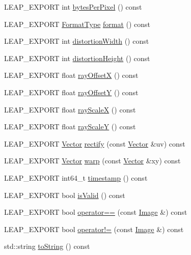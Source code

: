 \begin{DoxyCompactItemize}
\item 
L\+E\+A\+P\+\_\+\+E\+X\+P\+O\+RT int \hyperlink{class_leap_1_1_image_aa4a51ac912a8f4676b8b60c3119f0dba}{bytes\+Per\+Pixel} () const
\item 
L\+E\+A\+P\+\_\+\+E\+X\+P\+O\+RT \hyperlink{class_leap_1_1_image_acefbe5d3803afc9f433a6e3856d242d1}{Format\+Type} \hyperlink{class_leap_1_1_image_a50d3952ed622312536c9f935987156c1}{format} () const
\item 
L\+E\+A\+P\+\_\+\+E\+X\+P\+O\+RT int \hyperlink{class_leap_1_1_image_a8199bd54d44ad2f47f87c1672fae6fbc}{distortion\+Width} () const
\item 
L\+E\+A\+P\+\_\+\+E\+X\+P\+O\+RT int \hyperlink{class_leap_1_1_image_a151e6f3bf58e7b7e2f54d8620c440c1c}{distortion\+Height} () const
\item 
L\+E\+A\+P\+\_\+\+E\+X\+P\+O\+RT float \hyperlink{class_leap_1_1_image_ae07452257740b6050bf74cb835dc7f9a}{ray\+OffsetX} () const
\item 
L\+E\+A\+P\+\_\+\+E\+X\+P\+O\+RT float \hyperlink{class_leap_1_1_image_a7ae5ea2e7bcb151d50ad5ca03b1c3a37}{ray\+OffsetY} () const
\item 
L\+E\+A\+P\+\_\+\+E\+X\+P\+O\+RT float \hyperlink{class_leap_1_1_image_a250f1d16a456cc7887bb8a2ca3958bb0}{ray\+ScaleX} () const
\item 
L\+E\+A\+P\+\_\+\+E\+X\+P\+O\+RT float \hyperlink{class_leap_1_1_image_a2a234dbcb6818b0d7cf1527682c1fdf6}{ray\+ScaleY} () const
\item 
L\+E\+A\+P\+\_\+\+E\+X\+P\+O\+RT \hyperlink{struct_leap_1_1_vector}{Vector} \hyperlink{class_leap_1_1_image_a76443f4064feb15dad132be15f9fa444}{rectify} (const \hyperlink{struct_leap_1_1_vector}{Vector} \&uv) const
\item 
L\+E\+A\+P\+\_\+\+E\+X\+P\+O\+RT \hyperlink{struct_leap_1_1_vector}{Vector} \hyperlink{class_leap_1_1_image_a8bb3e9747ecaba23b2a47043d823ee24}{warp} (const \hyperlink{struct_leap_1_1_vector}{Vector} \&xy) const
\item 
L\+E\+A\+P\+\_\+\+E\+X\+P\+O\+RT int64\+\_\+t \hyperlink{class_leap_1_1_image_ae6cce7f3c7ebc323543a73f1b9c77dc3}{timestamp} () const
\item 
L\+E\+A\+P\+\_\+\+E\+X\+P\+O\+RT bool \hyperlink{class_leap_1_1_image_a536cc04b3a40a5e3527ca45d894d57fd}{is\+Valid} () const
\item 
L\+E\+A\+P\+\_\+\+E\+X\+P\+O\+RT bool \hyperlink{class_leap_1_1_image_a3418f0859f414d56bdfa19704020851c}{operator==} (const \hyperlink{class_leap_1_1_image}{Image} \&) const
\item 
L\+E\+A\+P\+\_\+\+E\+X\+P\+O\+RT bool \hyperlink{class_leap_1_1_image_a4ae4bb6f8dc39f0733f13de8f5ffbcf1}{operator!=} (const \hyperlink{class_leap_1_1_image}{Image} \&) const
\item 
std\+::string \hyperlink{class_leap_1_1_image_ae46e17c86b9975e29f6cd1a77d7722bd}{to\+String} () const
\end{DoxyCompactItemize}
